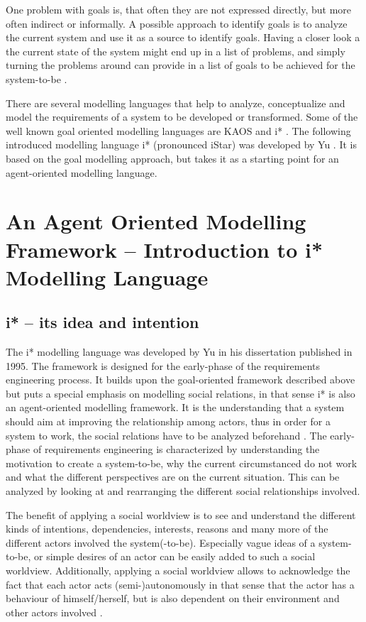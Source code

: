 \documentclass[11pt,a4paper]{article}
\begin{document}
One problem with goals is, that often they are not expressed directly, but
more often indirect or informally. A possible approach to identify goals is to
analyze the current system and use it as a source to identify goals. Having a
closer look a the current state of the system might end up in a list of
problems, and simply turning the problems around can provide in a list of
goals to be achieved for the system-to-be \cite[p.250f.]{vanLamsweerde.2001}.

There are several modelling languages that help to analyze, conceptualize and
model the requirements of a system to be developed or transformed. Some of the
well known goal oriented modelling languages are KAOS and i*
\cite{Dardenne.1993, Yu.1995}. The following introduced modelling language i*
(pronounced iStar) was developed by Yu \cite{Yu.1995}. It is based on the
goal modelling approach, but takes it as a starting point for an
agent-oriented modelling language.

\section{An Agent Oriented Modelling Framework -- Introduction to i* Modelling
  Language} 
\subsection{i* -- its idea and intention}
The i* modelling language was developed by Yu \cite{Yu.1995} in his
dissertation published in 1995. The framework is designed for the early-phase
of the requirements engineering process. It builds upon the goal-oriented
framework described above but puts a special emphasis on modelling social
relations, in that sense i* is also an agent-oriented modelling framework. It
is the understanding that a system should aim at improving the relationship
among actors, thus in order for a system to work, the social relations have to
be analyzed beforehand \cite{Yu.2011b}. The early-phase of requirements
engineering is characterized by understanding the motivation to create a
system-to-be, why the current circumstanced do not work and what the different
perspectives are on the current situation. This can be analyzed by looking at
and rearranging the different social relationships involved.

The benefit of applying a social worldview is to see and understand the
different kinds of intentions, dependencies, interests, reasons and many more
of the different actors involved the system(-to-be). Especially vague ideas of
a system-to-be, or simple desires of an actor can be easily added to such a
social worldview. Additionally, applying a social worldview allows to
acknowledge the fact that each actor acts (semi-)autonomously in that sense
that the actor has a behaviour of himself/herself, but is also dependent on
their environment and other actors involved \cite{Yu.2011b}.
\end{document}

